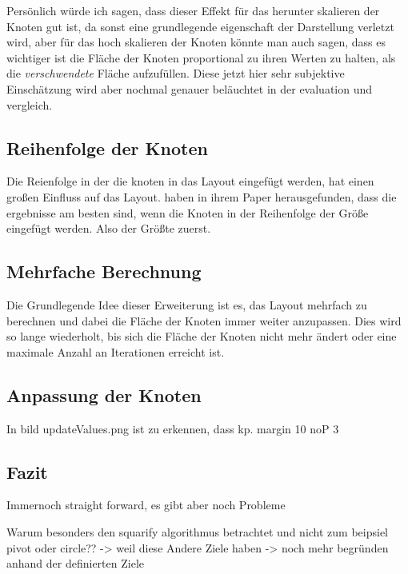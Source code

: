Persönlich würde ich sagen, dass dieser Effekt für das herunter skalieren der Knoten gut ist, da sonst eine grundlegende eigenschaft der Darstellung verletzt wird, aber für das hoch skalieren der Knoten könnte man auch sagen, dass es wichtiger ist die Fläche der Knoten proportional zu ihren Werten zu halten, als die \textit{verschwendete} Fläche aufzufüllen. Diese jetzt hier sehr subjektive Einschätzung wird aber nochmal genauer beläuchtet in der evaluation und vergleich.

\subsection{Reihenfolge der Knoten} \label{sec:ReihenfolgeKnoten}
Die Reienfolge in der die knoten in das Layout eingefügt werden, hat einen großen Einfluss auf das Layout. \cite{johnson1991tree} haben in ihrem Paper herausgefunden, dass die ergebnisse am besten sind, wenn die Knoten in der Reihenfolge der Größe eingefügt werden. Also der Größte zuerst.

\subsection{Mehrfache Berechnung} \label{sec:MehrfacheBerechnung}
Die Grundlegende Idee dieser Erweiterung ist es, das Layout mehrfach zu berechnen und dabei die Fläche der Knoten immer weiter anzupassen. Dies wird so lange wiederholt, bis sich die Fläche der Knoten nicht mehr ändert oder eine maximale Anzahl an Iterationen erreicht ist.

\subsection{Anpassung der Knoten}
In bild updateValues.png ist zu erkennen, dass kp. margin 10 noP 3


\subsection{Fazit}
Immernoch straight forward, es gibt aber noch Probleme 

Warum besonders den squarify algorithmus betrachtet und nicht zum beipsiel pivot oder circle?? -> weil diese Andere Ziele haben -> noch mehr begründen anhand der definierten Ziele